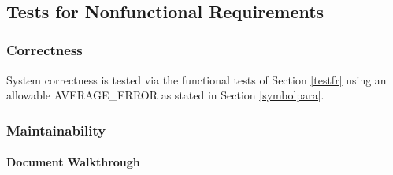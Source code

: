 \documentclass[12pt, titlepage]{article}
\begin{document}
~\newpage

\subsection{Tests for Nonfunctional Requirements}
\label{nfrtest}

\subsubsection{Correctness}

System correctness is tested via the functional tests of Section \ref{testfr} using an allowable AVERAGE\_ERROR as stated in Section \ref{symbolpara}.

\subsubsection{Maintainability}
		
\paragraph{Document Walkthrough}
\end{document}

